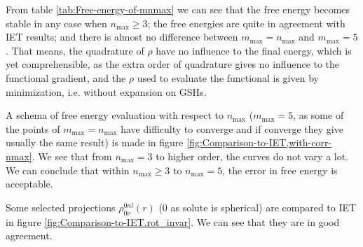 From table \ref{tab:Free-energy-of-mnmax} we can see that the free
energy becomes stable in any case when $n_{\max}\geq3$; the free
energies are quite in agreement with \acs{IET} results; and there
is almost no difference between $m_{\max}=n_{\max}$ and $m_{\max}=5$.
That means, the quadrature of $\rho$ have no influence to the final
energy, which is yet comprehensible, as the extra order of quadrature
gives no influence to the functional gradient, and the $\rho$ used
to evaluate the functional is given by minimization, i.e. without
expansion on \acs{GSH}s.

A schema of free energy evaluation with respect to $n_{\max}$ ($m_{\max}=5$,
as some of the points of $m_{\max}=n_{\max}$ have difficulty to converge
and if converge they give usually the same result) is made in figure
\ref{fig:Comparison-to-IET,with-corr-nmax}. We see that from $n_{\max}=3$
to higher order, the curves do not vary a lot. We can conclude that
within $n_{\max}\geq3$ to $n_{\max}=5$, the error in free energy
is acceptable.

Some selected projections $\rho_{0\nu}^{0nl}(r)$ (0 as solute is
spherical) are compared to \acs{IET} in figure \ref{fig:Comparison-to-IET.rot_invar}.
We can see that they are in good agreement.

